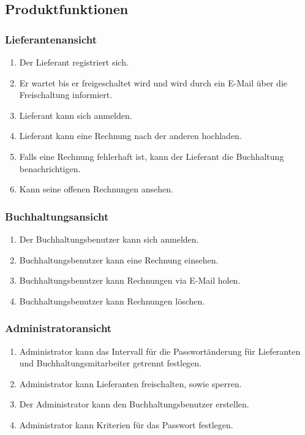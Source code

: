 \subsection{Produktfunktionen}


\subsubsection{Lieferantenansicht}
\begin{enumerate}
\item Der Lieferant registriert sich. 
\item Er wartet bis er freigeschaltet wird und wird durch ein E-Mail über
die Freischaltung informiert. 
\item Lieferant kann sich anmelden. 
\item Lieferant kann eine Rechnung nach der anderen hochladen. 
\item Falls eine Rechnung fehlerhaft ist, kann der Lieferant die Buchhaltung
benachrichtigen. 
\item Kann seine offenen Rechnungen ansehen. 
\end{enumerate}

\subsubsection{Buchhaltungsansicht}
\begin{enumerate}
\item Der Buchhaltungsbenutzer kann sich anmelden. 
\item Buchhaltungsbenutzer kann eine Rechnung einsehen. 
\item Buchhaltungsbenutzer kann Rechnungen via E-Mail holen. 
\item Buchhaltungsbenutzer kann Rechnungen löschen. 
\end{enumerate}

\subsubsection{Administratoransicht}
\begin{enumerate}
\item Administrator kann das Intervall für die Passwortänderung für Lieferanten
und Buchhaltungsmitarbeiter getrennt festlegen. 
\item Administrator kann Lieferanten freischalten, sowie sperren. 
\item Der Administrator kann den Buchhaltungsbenutzer erstellen. 
\item Administrator kann Kriterien für das Passwort festlegen. 
\end{enumerate}

